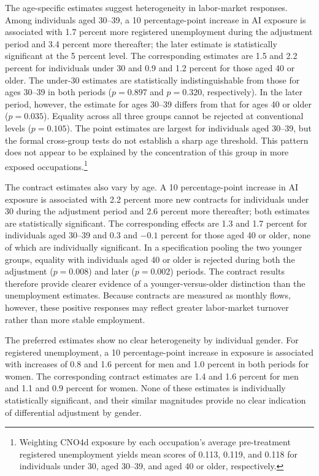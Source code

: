 The age-specific estimates suggest heterogeneity in labor-market responses. Among individuals aged 30--39, a 10 percentage-point increase in AI exposure is associated with 1.7 percent more registered unemployment during the adjustment period and 3.4 percent more thereafter; the later estimate is statistically significant at the 5 percent level. The corresponding estimates are 1.5 and 2.2 percent for individuals under 30 and 0.9 and 1.2 percent for those aged 40 or older. The under-30 estimates are statistically indistinguishable from those for ages 30--39 in both periods (\(p=0.897\) and \(p=0.320\), respectively). In the later period, however, the estimate for ages 30--39 differs from that for ages 40 or older (\(p=0.035\)). Equality across all three groups cannot be rejected at conventional levels (\(p=0.105\)). The point estimates are largest for individuals aged 30–39, but the formal cross-group tests do not establish a sharp age threshold. This pattern does not appear to be explained by the concentration of this group in more exposed occupations.\footnote{Weighting CNO4d exposure by each occupation's average pre-treatment registered unemployment yields mean scores of 0.113, 0.119, and 0.118 for individuals under 30, aged 30--39, and aged 40 or older, respectively.}

The contract estimates also vary by age. A 10 percentage-point increase in AI exposure is associated with 2.2 percent more new contracts for individuals under 30 during the adjustment period and 2.6 percent more thereafter; both estimates are statistically significant. The corresponding effects are 1.3 and 1.7 percent for individuals aged 30--39 and 0.3 and \(-0.1\) percent for those aged 40 or older, none of which are individually significant. In a specification pooling the two younger groups, equality with individuals aged 40 or older is rejected during both the adjustment (\(p=0.008\)) and later (\(p=0.002\)) periods. The contract results therefore provide clearer evidence of a younger-versus-older distinction than the unemployment estimates. Because contracts are measured as monthly flows, however, these positive responses may reflect greater labor-market turnover rather than more stable employment.

The preferred estimates show no clear heterogeneity by individual gender. For registered unemployment, a 10 percentage-point increase in exposure is associated with increases of 0.8 and 1.6 percent for men and 1.0 percent in both periods for women. The corresponding contract estimates are 1.4 and 1.6 percent for men and 1.1 and 0.9 percent for women. None of these estimates is individually statistically significant, and their similar magnitudes provide no clear indication of differential adjustment by gender.

